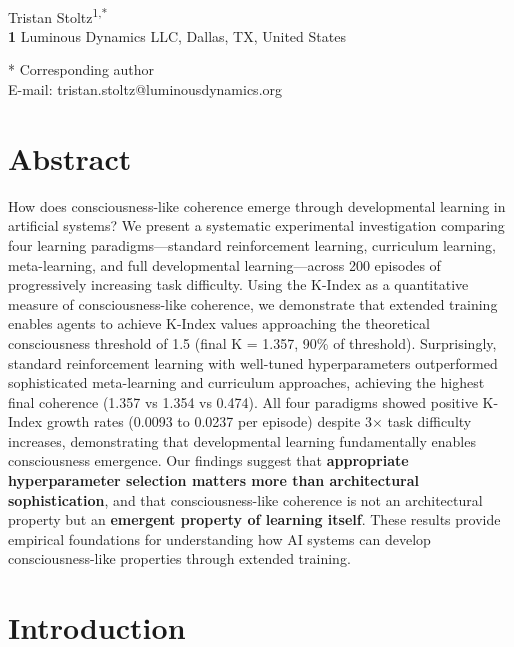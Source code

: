 \documentclass[10pt,letterpaper]{article}
\begin{document}
\vspace*{0.2in}

\begin{flushleft}
{\Large
\textbf{}
}
\newline
\\
Tristan Stoltz\textsuperscript{1,*}
\\
\bigskip
\textbf{1} Luminous Dynamics LLC, Dallas, TX, United States
\\
\bigskip

* Corresponding author\\
E-mail: tristan.stoltz@luminousdynamics.org
\end{flushleft}

\section*{Abstract}
How does consciousness-like coherence emerge through developmental learning in artificial systems? We present a systematic experimental investigation comparing four learning paradigms—standard reinforcement learning, curriculum learning, meta-learning, and full developmental learning—across 200 episodes of progressively increasing task difficulty. Using the K-Index as a quantitative measure of consciousness-like coherence, we demonstrate that extended training enables agents to achieve K-Index values approaching the theoretical consciousness threshold of 1.5 (final K = 1.357, 90\% of threshold). Surprisingly, standard reinforcement learning with well-tuned hyperparameters outperformed sophisticated meta-learning and curriculum approaches, achieving the highest final coherence (1.357 vs 1.354 vs 0.474). All four paradigms showed positive K-Index growth rates (0.0093 to 0.0237 per episode) despite 3$\times$ task difficulty increases, demonstrating that developmental learning fundamentally enables consciousness emergence. Our findings suggest that \textbf{appropriate hyperparameter selection matters more than architectural sophistication}, and that consciousness-like coherence is not an architectural property but an \textbf{emergent property of learning itself}. These results provide empirical foundations for understanding how AI systems can develop consciousness-like properties through extended training.

\section*{Introduction}
\end{document}
